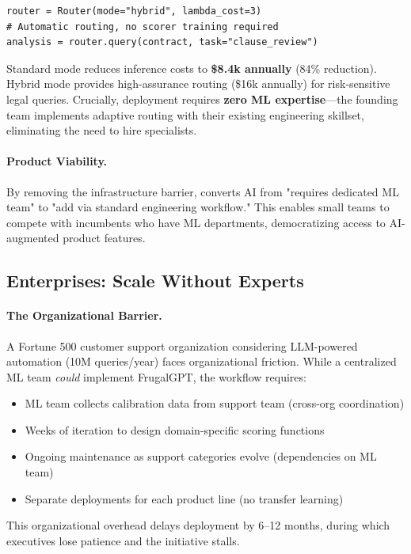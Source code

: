\begin{verbatim}
router = Router(mode="hybrid", lambda_cost=3)
# Automatic routing, no scorer training required
analysis = router.query(contract, task="clause_review")
\end{verbatim}

Standard mode reduces inference costs to \textbf{\$8.4k annually} (84\% reduction). Hybrid mode provides high-assurance routing (\$16k annually) for risk-sensitive legal queries. Crucially, deployment requires \textbf{zero ML expertise}---the founding team implements adaptive routing with their existing engineering skillset, eliminating the need to hire specialists.

\paragraph{Product Viability.} By removing the infrastructure barrier, \ours{} converts AI from "requires dedicated ML team" to "add via standard engineering workflow." This enables small teams to compete with incumbents who have ML departments, democratizing access to AI-augmented product features.

\subsection{Enterprises: Scale Without Experts}

\paragraph{The Organizational Barrier.} A Fortune 500 customer support organization considering LLM-powered automation (10M queries/year) faces organizational friction. While a centralized ML team \emph{could} implement FrugalGPT, the workflow requires:
\begin{itemize}[leftmargin=*,nosep]
    \item ML team collects calibration data from support team (cross-org coordination)
    \item Weeks of iteration to design domain-specific scoring functions
    \item Ongoing maintenance as support categories evolve (dependencies on ML team)
    \item Separate deployments for each product line (no transfer learning)
\end{itemize}

This organizational overhead delays deployment by 6--12 months, during which executives lose patience and the initiative stalls.

